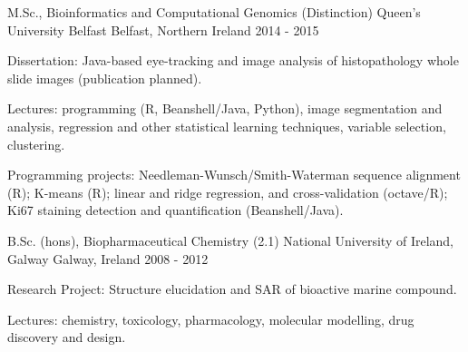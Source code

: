 


\begin{cventries}


\cventry
{M.Sc., Bioinformatics and Computational Genomics (Distinction)} %
{Queen's University Belfast} %
{Belfast, Northern Ireland} %
{2014 - 2015} %
{ %
\begin{cvitems}
\item {Dissertation: Java-based eye-tracking and image analysis of histopathology whole slide images (publication planned).}
\item {Lectures: programming (R, Beanshell/Java, Python), 
image segmentation and analysis, regression and other 
statistical learning techniques, variable selection, clustering.}
\item {Programming projects: Needleman-Wunsch/Smith-Waterman sequence alignment (R); K-means (R); linear and ridge regression, and cross-validation (octave/R); Ki67 staining detection and quantification (Beanshell/Java).}
\end{cvitems}
}
\cventry
{B.Sc. (hons), Biopharmaceutical Chemistry (2.1)} %
{National University of Ireland, Galway} %
{Galway, Ireland} %
{2008 - 2012} %
{ %
\begin{cvitems}
\item {Research Project: Structure elucidation and SAR of bioactive marine compound.}
\item {Lectures: chemistry, toxicology, pharmacology, molecular modelling,
drug discovery and design.}
\end{cvitems}
}



\end{cventries}
